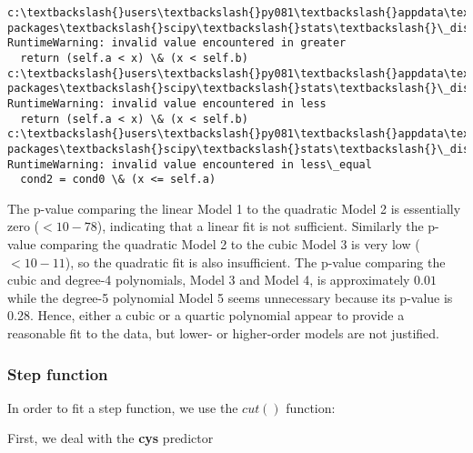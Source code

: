 \documentclass[11pt]{article}
\begin{document}
    \begin{Verbatim}[commandchars=\\\{\}]
c:\textbackslash{}users\textbackslash{}py081\textbackslash{}appdata\textbackslash{}local\textbackslash{}programs\textbackslash{}python\textbackslash{}python35\textbackslash{}lib\textbackslash{}site-packages\textbackslash{}scipy\textbackslash{}stats\textbackslash{}\_distn\_infrastructure.py:879: RuntimeWarning: invalid value encountered in greater
  return (self.a < x) \& (x < self.b)
c:\textbackslash{}users\textbackslash{}py081\textbackslash{}appdata\textbackslash{}local\textbackslash{}programs\textbackslash{}python\textbackslash{}python35\textbackslash{}lib\textbackslash{}site-packages\textbackslash{}scipy\textbackslash{}stats\textbackslash{}\_distn\_infrastructure.py:879: RuntimeWarning: invalid value encountered in less
  return (self.a < x) \& (x < self.b)
c:\textbackslash{}users\textbackslash{}py081\textbackslash{}appdata\textbackslash{}local\textbackslash{}programs\textbackslash{}python\textbackslash{}python35\textbackslash{}lib\textbackslash{}site-packages\textbackslash{}scipy\textbackslash{}stats\textbackslash{}\_distn\_infrastructure.py:1821: RuntimeWarning: invalid value encountered in less\_equal
  cond2 = cond0 \& (x <= self.a)

    \end{Verbatim}

    The p-value comparing the linear Model 1 to the quadratic Model 2 is
essentially zero (\(<10−78\)), indicating that a linear fit is not
sufficient. Similarly the p-value comparing the quadratic Model 2 to the
cubic Model 3 is very low (\(<10-11\)), so the quadratic fit is also
insufficient. The p-value comparing the cubic and degree-4 polynomials,
Model 3 and Model 4, is approximately \(0.01\) while the degree-5
polynomial Model 5 seems unnecessary because its p-value is \(0.28\).
Hence, either a cubic or a quartic polynomial appear to provide a
reasonable fit to the data, but lower- or higher-order models are not
justified.

    \hypertarget{step-function}{%
\subsubsection{Step function}\label{step-function}}

    In order to fit a step function, we use the \(cut()\) function:

    First, we deal with the \textbf{cys} predictor
\end{document}
